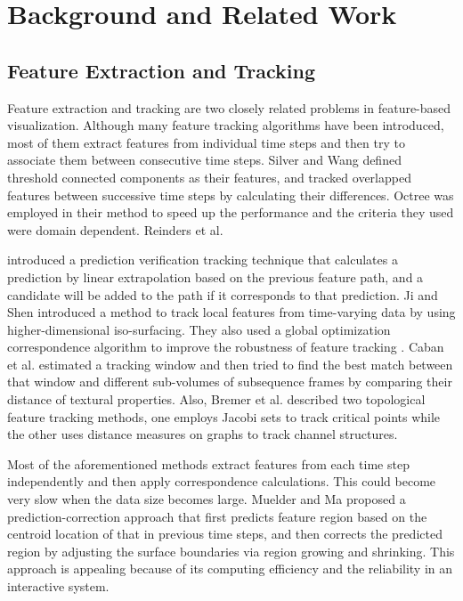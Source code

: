 \documentclass[10pt, conference, compsocconf]{IEEEtran}
\begin{document}
\section{Background and Related Work}

\subsection{Feature Extraction and Tracking}

Feature extraction and tracking are two closely related problems in feature-based visualization. Although many feature tracking algorithms have been introduced, most of them extract features from individual time steps and then try to associate them between consecutive time steps. Silver and Wang \cite{Silver1997} defined threshold connected components as their features, and tracked overlapped features between successive time steps by calculating their differences. Octree was employed in their method to speed up the performance and the criteria they used were domain dependent. Reinders et al.

\cite{Reinders2001} introduced a prediction verification tracking technique that calculates a prediction by linear extrapolation based on the previous feature path, and a candidate will be added to the path if it corresponds to that prediction. Ji and Shen \cite{Ji2003} introduced a method to track local features from time-varying data by using higher-dimensional iso-surfacing. They also used a global optimization correspondence algorithm to improve the robustness of feature tracking \cite{Ji2006}. Caban et al. \cite{Caban2007} estimated a tracking window and then tried to find the best match between that window and different sub-volumes of subsequence frames by comparing their distance of textural properties. Also, Bremer et al. \cite{Bremer2007} described two topological feature tracking methods, one employs Jacobi sets to track critical points while the other uses distance measures on graphs to track channel structures.

Most of the aforementioned methods extract features from each time step independently and then apply correspondence calculations. This could become very slow when the data size becomes large. Muelder and Ma \cite{Muelder2009} proposed a prediction-correction approach that first predicts feature region based on the centroid location of that in previous time steps, and then corrects the predicted region by adjusting the surface boundaries via region growing and shrinking. This approach is appealing because of its computing efficiency and the reliability in an interactive system.
\end{document}
